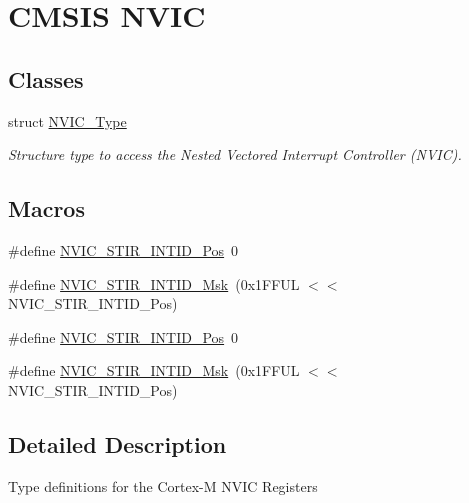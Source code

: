 \hypertarget{group___c_m_s_i_s___n_v_i_c}{\section{C\-M\-S\-I\-S N\-V\-I\-C}
\label{group___c_m_s_i_s___n_v_i_c}
}
\subsection*{Classes}
\begin{DoxyCompactItemize}
\item 
struct \hyperlink{struct_n_v_i_c___type}{N\-V\-I\-C\-\_\-\-Type}
\begin{DoxyCompactList}\small\item\em Structure type to access the Nested Vectored Interrupt Controller (N\-V\-I\-C). \end{DoxyCompactList}\end{DoxyCompactItemize}
\subsection*{Macros}
\begin{DoxyCompactItemize}
\item 
\#define \hyperlink{group___c_m_s_i_s___n_v_i_c_ga9eebe495e2e48d302211108837a2b3e8}{N\-V\-I\-C\-\_\-\-S\-T\-I\-R\-\_\-\-I\-N\-T\-I\-D\-\_\-\-Pos}~0
\item 
\#define \hyperlink{group___c_m_s_i_s___n_v_i_c_gae4060c4dfcebb08871ca4244176ce752}{N\-V\-I\-C\-\_\-\-S\-T\-I\-R\-\_\-\-I\-N\-T\-I\-D\-\_\-\-Msk}~(0x1\-F\-F\-U\-L $<$$<$ N\-V\-I\-C\-\_\-\-S\-T\-I\-R\-\_\-\-I\-N\-T\-I\-D\-\_\-\-Pos)
\item 
\#define \hyperlink{group___c_m_s_i_s___n_v_i_c_ga9eebe495e2e48d302211108837a2b3e8}{N\-V\-I\-C\-\_\-\-S\-T\-I\-R\-\_\-\-I\-N\-T\-I\-D\-\_\-\-Pos}~0
\item 
\#define \hyperlink{group___c_m_s_i_s___n_v_i_c_gae4060c4dfcebb08871ca4244176ce752}{N\-V\-I\-C\-\_\-\-S\-T\-I\-R\-\_\-\-I\-N\-T\-I\-D\-\_\-\-Msk}~(0x1\-F\-F\-U\-L $<$$<$ N\-V\-I\-C\-\_\-\-S\-T\-I\-R\-\_\-\-I\-N\-T\-I\-D\-\_\-\-Pos)
\end{DoxyCompactItemize}


\subsection{Detailed Description}
Type definitions for the Cortex-\/\-M N\-V\-I\-C Registers 

